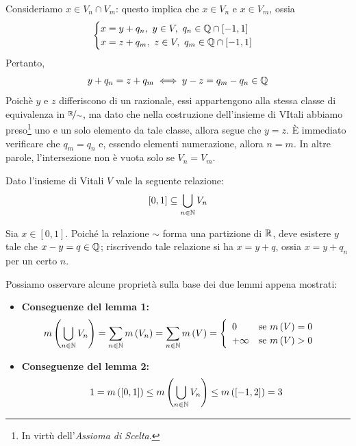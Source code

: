 \begin{demonstration}
	Consideriamo $x\in V_n\cap V_m$: questo implica che $x\in V_n$ e $x\in V_m$, ossia
	\begin{equation*}
		\begin{cases}
			x=y+q_n,\ y\in V,\ q_n\in\mathbb{Q}\cap\left[-1,1\right]\\
			x=z+q_m,\ z\in V,\ q_m\in\mathbb{Q}\cap\left[-1,1\right]
		\end{cases}
	\end{equation*}
	Pertanto,
	\begin{equation*}
		y+q_n=z+q_m\iff y-z=q_m-q_n\in\mathbb{Q}
	\end{equation*}
	Poichè $y$ e $z$ differiscono di un razionale, essi appartengono alla stessa classe di equivalenza in $\nicefrac{\mathbb{R}}{\sim}$, ma dato che nella costruzione dell'insieme di VItali abbiamo preso\footnote{In virtù dell'\textit{Assioma di Scelta}.} uno e un solo elemento da tale classe, allora segue che $y=z$. È immediato verificare che $q_m=q_n$ e, essendo elementi numerazione, allora $n=m$. In altre parole, l'intersezione non è vuota solo se $V_n=V_m$.
\end{demonstration}
\begin{lemming}
	Dato l'insieme di Vitali $V$ vale la seguente relazione:
	\begin{equation*}
		\left[0,1\right]\subseteq\bigcup_{n\in\mathbb{N}}V_n
	\end{equation*}
\end{lemming}
\begin{demonstration}
	Sia $x\in\left[0,1\right]$. Poiché la relazione $\sim$ forma una partizione di $\mathbb{R}$, deve esistere $y$ tale che $x-y=q\in\mathbb{Q}$; riscrivendo tale relazione si ha $x=y+q$, ossia $x=y+q_n$ per un certo $n$.
\end{demonstration}
Possiamo osservare alcune proprietà sulla base dei due lemmi appena mostrati:
\begin{itemize}
	\item \textbf{Conseguenze del lemma 1:}
	\begin{equation*}
		m\left(\bigcup_{n\in\mathbb{N}}V_n\right)=\sum_{n\in\mathbb{N}}m\left(V_n\right)=\sum_{n\in\mathbb{N}}m\left(V\right)=\begin{cases}
			\begin{array}{ll}
				0&\text{se }m\left(V\right)=0\\
				+\infty&\text{se }m\left(V\right)>0
			\end{array}
		\end{cases}
	\end{equation*}
	\item \textbf{Conseguenze del lemma 2:}
	\begin{equation*}
		1=m\left(\left[0,1\right]\right)\leq m\left(\bigcup_{n\in\mathbb{N}}V_n\right)\leq m\left(\left[-1,2\right]\right)=3
	\end{equation*}
\end{itemize}
